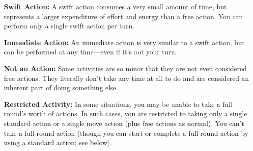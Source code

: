 \textbf{Swift Action:} A swift action consumes a very small amount of time, but represents a larger expenditure of effort and energy than a free action. You can perform only a single swift action per turn.

\textbf{Immediate Action:} An immediate action is very similar to a swift action, but can be performed at any time---even if it's not your turn.

\textbf{Not an Action:} Some activities are so minor that they are not even considered free actions. They literally don't take any time at all to do and are considered an inherent part of doing something else.

\textbf{Restricted Activity:} In some situations, you may be unable to take a full round's worth of actions. In such cases, you are restricted to taking only a single standard action or a single move action (plus free actions as normal). You can't take a full-round action (though you can start or complete a full-round action by using a standard action; see below).